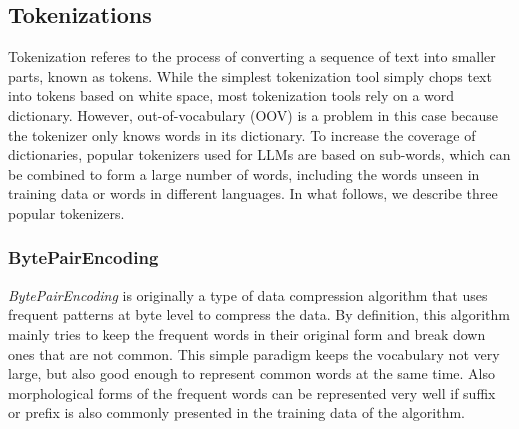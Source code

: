\documentclass[conference]{IEEEtran}
\begin{document}
\subsection{Tokenizations}
Tokenization referes to the process of converting a sequence of text into smaller parts, known as tokens.  %
While the simplest tokenization tool simply chops text into tokens based on white space, most tokenization tools rely on a word dictionary. 
However, out-of-vocabulary (OOV) is a problem in this case because the tokenizer only knows words in its dictionary.
To increase the coverage of dictionaries, popular tokenizers used for LLMs are based on sub-words, which can be combined to form a large number of words, including the words unseen in training data or words in different languages.
In what follows, we describe three popular tokenizers.


\subsubsection{\textbf{BytePairEncoding}}
\textit{BytePairEncoding} is originally a type of data compression algorithm that uses frequent patterns at byte level to compress the data. By definition, this algorithm mainly tries to keep the frequent words in their original form and break down ones that are not common. This simple paradigm keeps the vocabulary not very large, but also good enough to represent common words at the same time. Also morphological forms of the frequent words can be represented very well if suffix or prefix is also commonly presented in the training data of the algorithm.
\end{document}
